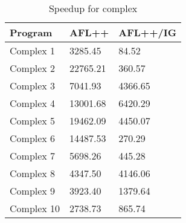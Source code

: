 \begin{table}
\caption{Speedup for complex}
\label{tab:complex_speedup}
\begin{tabular}{lll}
\toprule
Program & AFL++ & AFL++/IG \\
\midrule
Complex 1 & 3285.45 & 84.52 \\
Complex 2 & 22765.21 & 360.57 \\
Complex 3 & 7041.93 & 4366.65 \\
Complex 4 & 13001.68 & 6420.29 \\
Complex 5 & 19462.09 & 4450.07 \\
Complex 6 & 14487.53 & 270.29 \\
Complex 7 & 5698.26 & 445.28 \\
Complex 8 & 4347.50 & 4146.06 \\
Complex 9 & 3923.40 & 1379.64 \\
Complex 10 & 2738.73 & 865.74 \\
\bottomrule
\end{tabular}
\end{table}
